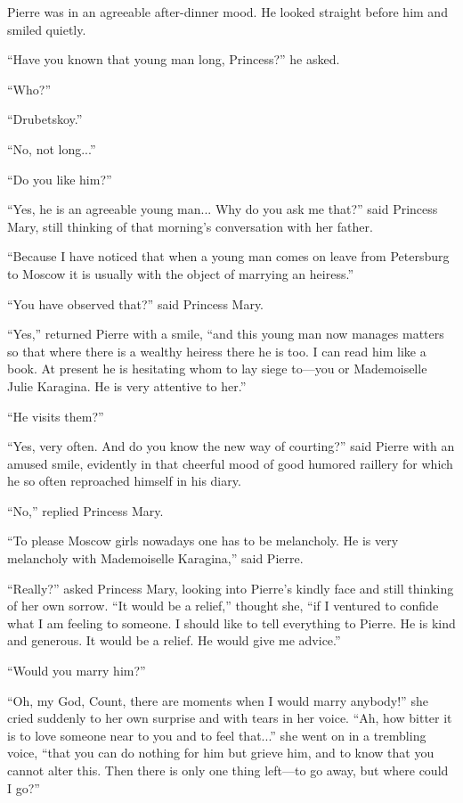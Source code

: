 Pierre was in an agreeable after-dinner mood. He looked straight
before him and smiled quietly.

``Have you known that young man long, Princess?'' he asked.

``Who?''

``Drubetskoy.''

``No, not long...''

``Do you like him?''

``Yes, he is an agreeable young man... Why do you ask me that?''
said Princess Mary, still thinking of that morning's conversation
with her father.

``Because I have noticed that when a young man comes on leave
from Petersburg to Moscow it is usually with the object of
marrying an heiress.''

``You have observed that?'' said Princess Mary.

``Yes,'' returned Pierre with a smile, ``and this young man now
manages matters so that where there is a wealthy heiress there he
is too. I can read him like a book. At present he is hesitating
whom to lay siege to---you or Mademoiselle Julie Karagina. He is
very attentive to her.''

``He visits them?''

``Yes, very often. And do you know the new way of courting?''
said Pierre with an amused smile, evidently in that cheerful mood
of good humored raillery for which he so often reproached himself
in his diary.

``No,'' replied Princess Mary.

``To please Moscow girls nowadays one has to be melancholy. He is
very melancholy with Mademoiselle Karagina,'' said Pierre.

``Really?'' asked Princess Mary, looking into Pierre's kindly
face and still thinking of her own sorrow. ``It would be a
relief,'' thought she, ``if I ventured to confide what I am
feeling to someone. I should like to tell everything to
Pierre. He is kind and generous. It would be a relief. He would
give me advice.''

``Would you marry him?''

``Oh, my God, Count, there are moments when I would marry
anybody!'' she cried suddenly to her own surprise and with tears
in her voice. ``Ah, how bitter it is to love someone near to you
and to feel that...'' she went on in a trembling voice, ``that
you can do nothing for him but grieve him, and to know that you
cannot alter this. Then there is only one thing left---to go
away, but where could I go?''

